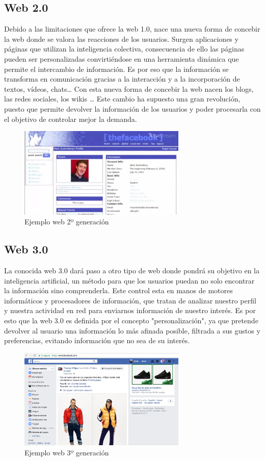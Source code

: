 \subsection*{Web 2.0}
Debido a las limitaciones que ofrece la web 1.0, nace una nueva forma de concebir la web donde se valora las reacciones de los usuarios. Surgen aplicaciones y páginas que utilizan la inteligencia colectiva, consecuencia de ello las páginas pueden ser personalizadas convirtiéndose en una herramienta dinámica que permite el intercambio de información. Es por eso que la información se transforma en comunicación gracias a la interacción y a la incorporación de textos, vídeos, chats… Con esta nueva forma de concebir la web nacen los blogs, las redes sociales, los wikis … Este cambio ha supuesto una gran revolución, puesto que permite devolver la información de los usuarios y poder procesarla con el objetivo de controlar mejor la demanda. 


\begin{figure}[H]
    \centering
    \includegraphics[width=80mm]{memoria/LaTeX/img/introduccion/web2.jpeg}
    \caption{Ejemplo web 2º generación}
\end{figure}

\subsection*{Web 3.0}
La conocida web 3.0 dará paso a otro tipo de web donde pondrá su objetivo en la inteligencia artificial, un método para que los usuarios puedan no solo encontrar la información sino comprenderla. Este control esta en manos de motores informáticos y procesadores de información, que tratan de analizar nuestro perfil y nuestra actividad en red para enviarnos información de nuestro interés. 
Es por esto que la web 3.0 es definida por el concepto "personalización", ya que pretende devolver al usuario una información lo más afinada posible, filtrada a sus gustos y preferencias, evitando información que no sea de su interés.

\begin{figure}[H]
    \centering
    \includegraphics[width=80mm]{memoria/LaTeX/img/introduccion/facebook.png}
    \caption{Ejemplo web 3º generación}
\end{figure}



